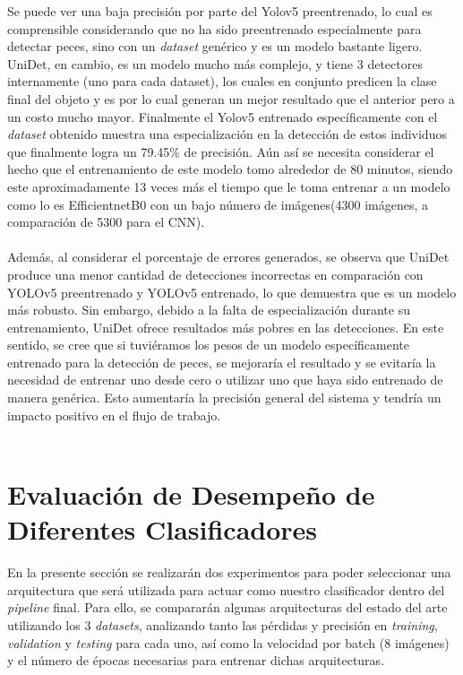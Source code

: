 Se puede ver una baja precisión por parte del Yolov5 preentrenado, lo cual es comprensible considerando que no ha sido preentrenado especialmente para detectar peces, sino con un \textit{dataset} genérico y es un modelo bastante ligero. UniDet, en cambio, es un modelo mucho más complejo, y tiene 3 detectores internamente (uno para cada dataset), los cuales en conjunto predicen la clase final del objeto y es por lo cual generan un mejor resultado que el anterior pero a un costo mucho mayor. Finalmente el Yolov5 entrenado específicamente con el \textit{dataset} obtenido muestra una especialización en la detección de estos individuos que finalmente logra un 79.45\% de precisión. Aún así se necesita considerar el hecho que el entrenamiento de este modelo tomo alrededor de 80 minutos, siendo este aproximadamente 13 veces más el tiempo que le toma entrenar a un modelo como lo es EfficientnetB0 con un bajo número de imágenes(4300 imágenes, a comparación de 5300 para el CNN).
\\\\

Además, al considerar el porcentaje de errores generados, se observa que UniDet produce 
una menor cantidad de detecciones incorrectas en comparación con YOLOv5 preentrenado y 
YOLOv5 entrenado, lo que demuestra que es un modelo más robusto. Sin embargo, debido a 
la falta de especialización durante su entrenamiento, UniDet ofrece resultados más pobres 
en las detecciones. En este sentido, se cree que si tuviéramos los pesos de un modelo 
específicamente entrenado para la detección de peces, se mejoraría el resultado y se 
evitaría la necesidad de entrenar uno desde cero o utilizar uno que haya sido entrenado 
de manera genérica. Esto aumentaría la precisión general del sistema y tendría un 
impacto positivo en el flujo de trabajo.
\\\\

\section{Evaluación de Desempeño de Diferentes Clasificadores}
En la presente sección se realizarán dos experimentos para poder seleccionar una arquitectura que será utilizada para actuar como nuestro clasificador dentro del \textit{pipeline} final. Para ello, se compararán algunas arquitecturas del estado del arte utilizando los 3 \textit{datasets}, analizando tanto las pérdidas y precisión en \textit{training}, \textit{validation} y \textit{testing} para cada uno, así como la velocidad por batch (8 imágenes) y el número de épocas necesarias para entrenar dichas arquitecturas. 
